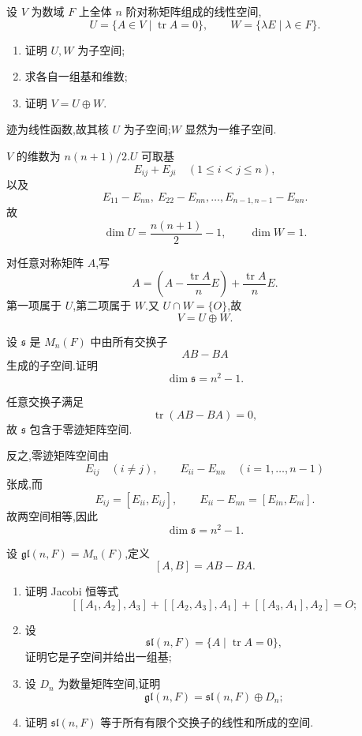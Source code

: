 \begin{example}[\markstar]
设 $V$ 为数域 $F$ 上全体 $n$ 阶对称矩阵组成的线性空间,
\[
U=\{A\in V\mid\operatorname{tr}A=0\},
\qquad
W=\{\lambda E\mid\lambda\in F\}.
\]
\begin{enumerate}
  \item 证明 $U,W$ 为子空间;
  \item 求各自一组基和维数;
  \item 证明 $V=U\oplus W$.
\end{enumerate}
\end{example}
\exampleblank

\begin{solution}
迹为线性函数,故其核 $U$ 为子空间;$W$ 显然为一维子空间.

$V$ 的维数为 $n(n+1)/2$.$U$ 可取基
\[
E_{ij}+E_{ji}\quad(1\leq i<j\leq n),
\]
以及
\[
E_{11}-E_{nn},\ E_{22}-E_{nn},\ldots,E_{n-1,n-1}-E_{nn}.
\]
故
\[
\dim U=\dfrac{n(n+1)}2-1,
\qquad \dim W=1.
\]

对任意对称矩阵 $A$,写
\[
A=
\left(A-\dfrac{\operatorname{tr}A}{n}E\right)
+\dfrac{\operatorname{tr}A}{n}E.
\]
第一项属于 $U$,第二项属于 $W$.又 $U\cap W=\{O\}$,故
\[
\boxed{V=U\oplus W}.
\]
\end{solution}

\begin{example}[\markstar]
设 $\mathfrak s$ 是 $M_n(F)$ 中由所有交换子
\[
AB-BA
\]
生成的子空间.证明
\[
\dim\mathfrak s=n^2-1.
\]
\end{example}
\exampleblank

\begin{solution}
任意交换子满足
\[
\operatorname{tr}(AB-BA)=0,
\]
故 $\mathfrak s$ 包含于零迹矩阵空间.

反之,零迹矩阵空间由
\[
E_{ij}\quad(i\neq j),
\qquad E_{ii}-E_{nn}\quad(i=1,\ldots,n-1)
\]
张成,而
\[
E_{ij}=[E_{ii},E_{ij}],
\qquad
E_{ii}-E_{nn}=[E_{in},E_{ni}].
\]
故两空间相等,因此
\[
\boxed{\dim\mathfrak s=n^2-1}.
\]
\end{solution}

\begin{example}[\markstar]
设 $\mathfrak{gl}(n,F)=M_n(F)$,定义
\[
[A,B]=AB-BA.
\]
\begin{enumerate}
  \item 证明 Jacobi 恒等式
  \[
  [[A_1,A_2],A_3]+[[A_2,A_3],A_1]+[[A_3,A_1],A_2]=O;
  \]
  \item 设
  \[
  \mathfrak{sl}(n,F)=\{A\mid\operatorname{tr}A=0\},
  \]
  证明它是子空间并给出一组基;
  \item 设 $D_n$ 为数量矩阵空间,证明
  \[
  \mathfrak{gl}(n,F)=\mathfrak{sl}(n,F)\oplus D_n;
  \]
  \item 证明 $\mathfrak{sl}(n,F)$ 等于所有有限个交换子的线性和所成的空间.
\end{enumerate}
\end{example}
\exampleblank

